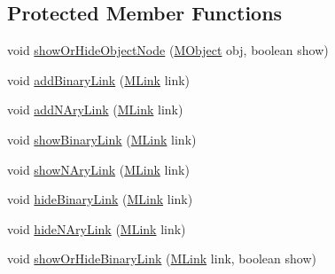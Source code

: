 \subsection*{Protected Member Functions}
\begin{DoxyCompactItemize}
\item 
void \hyperlink{classorg_1_1tzi_1_1use_1_1gui_1_1views_1_1diagrams_1_1objectdiagram_1_1_new_object_diagram_a95cf84f573d3337c894b7937454a4c28}{show\-Or\-Hide\-Object\-Node} (\hyperlink{interfaceorg_1_1tzi_1_1use_1_1uml_1_1sys_1_1_m_object}{M\-Object} obj, boolean show)
\item 
void \hyperlink{classorg_1_1tzi_1_1use_1_1gui_1_1views_1_1diagrams_1_1objectdiagram_1_1_new_object_diagram_a23d2c296aeaeacc3ad645e9790425ba4}{add\-Binary\-Link} (\hyperlink{interfaceorg_1_1tzi_1_1use_1_1uml_1_1sys_1_1_m_link}{M\-Link} link)
\item 
void \hyperlink{classorg_1_1tzi_1_1use_1_1gui_1_1views_1_1diagrams_1_1objectdiagram_1_1_new_object_diagram_aec7dae3ab6faab313adbfc556101eca9}{add\-N\-Ary\-Link} (\hyperlink{interfaceorg_1_1tzi_1_1use_1_1uml_1_1sys_1_1_m_link}{M\-Link} link)
\item 
void \hyperlink{classorg_1_1tzi_1_1use_1_1gui_1_1views_1_1diagrams_1_1objectdiagram_1_1_new_object_diagram_ab1de9c6a9666a088c2af5def3d2485ac}{show\-Binary\-Link} (\hyperlink{interfaceorg_1_1tzi_1_1use_1_1uml_1_1sys_1_1_m_link}{M\-Link} link)
\item 
void \hyperlink{classorg_1_1tzi_1_1use_1_1gui_1_1views_1_1diagrams_1_1objectdiagram_1_1_new_object_diagram_a7f83513a77ea309fed88a08e33120fb3}{show\-N\-Ary\-Link} (\hyperlink{interfaceorg_1_1tzi_1_1use_1_1uml_1_1sys_1_1_m_link}{M\-Link} link)
\item 
void \hyperlink{classorg_1_1tzi_1_1use_1_1gui_1_1views_1_1diagrams_1_1objectdiagram_1_1_new_object_diagram_a43f3abf94b6640af933ae2a024eb7238}{hide\-Binary\-Link} (\hyperlink{interfaceorg_1_1tzi_1_1use_1_1uml_1_1sys_1_1_m_link}{M\-Link} link)
\item 
void \hyperlink{classorg_1_1tzi_1_1use_1_1gui_1_1views_1_1diagrams_1_1objectdiagram_1_1_new_object_diagram_a40da5556fc05ce84b8da27fb71ced98a}{hide\-N\-Ary\-Link} (\hyperlink{interfaceorg_1_1tzi_1_1use_1_1uml_1_1sys_1_1_m_link}{M\-Link} link)
\item 
void \hyperlink{classorg_1_1tzi_1_1use_1_1gui_1_1views_1_1diagrams_1_1objectdiagram_1_1_new_object_diagram_a7c91ef4a30a18209163d7544e98a657a}{show\-Or\-Hide\-Binary\-Link} (\hyperlink{interfaceorg_1_1tzi_1_1use_1_1uml_1_1sys_1_1_m_link}{M\-Link} link, boolean show)

\end{DoxyCompactItemize}
